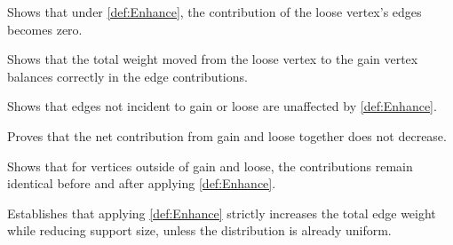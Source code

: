 \begin{lemma}
  \label{lem:Enhance_loose_sum}
  \leanok
  Shows that under \ref{def:Enhance}, the contribution of the loose vertex’s edges
  becomes zero.
\end{lemma}

\begin{lemma}
  \label{lem:Enhance_sum_loose_gain_equal}
  \leanok
  Shows that the total weight moved from the loose vertex to the gain vertex
  balances correctly in the edge contributions.
\end{lemma}

\begin{lemma}
  \label{lem:Enhance_sum_complement_unchanged}
  \leanok
  Shows that edges not incident to gain or loose are unaffected by \ref{def:Enhance}.
\end{lemma}

\begin{lemma}
  \label{lem:Enhance_edge_gainloose_increase}
  \leanok
  Proves that the net contribution from gain and loose together does not decrease.
\end{lemma}

\begin{lemma}
  \label{lem:Enhance_support_edges_same}
  \leanok
  Shows that for vertices outside of gain and loose, the contributions remain identical
  before and after applying \ref{def:Enhance}.
\end{lemma}

\begin{theorem}
  \label{thm:Enhance_total_weight_stricinc}
  \leanok
  Establishes that applying \ref{def:Enhance} strictly increases the total
  edge weight while reducing support size, unless the distribution is already uniform.
\end{theorem}

